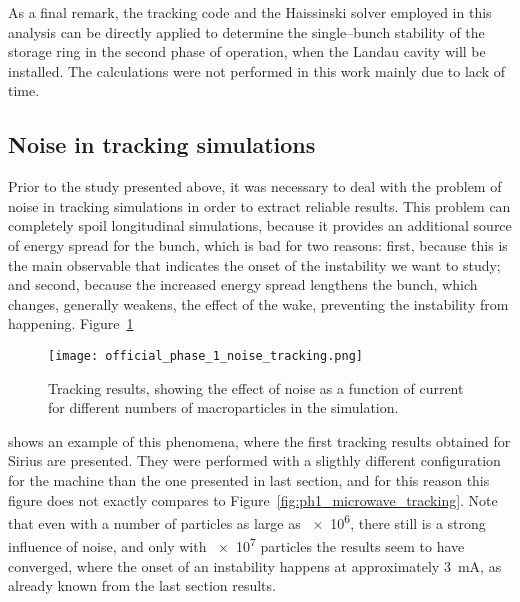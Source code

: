     As a final remark, the tracking code and the Haissinski solver employed in this analysis can be directly applied to determine the single--bunch stability of the storage ring in the second phase of operation, when the Landau cavity will be installed. The calculations were not performed in this work mainly due to lack of time.

\subsection{Noise in tracking simulations}\label{ssec:noise}

    Prior to the study presented above, it was necessary to deal with the problem of noise in tracking simulations in order to extract reliable results. This problem can completely spoil longitudinal simulations, because it provides an additional source of energy spread for the bunch, which is bad for two reasons: first, because this is the main observable that indicates the onset of the instability we want to study; and second, because the increased energy spread lengthens the bunch, which changes, generally weakens, the effect of the wake, preventing the instability from happening. Figure~\ref{fig:first_tracking}
    \begin{figure}
        \centering
        \texttt{[image: official\_phase\_1\_noise\_tracking.png]}
        \caption{Tracking results, showing the effect of noise as a function of current for different numbers of macroparticles in the simulation.}
        \label{fig:first_tracking}
    \end{figure}
    shows an example of this phenomena, where the first tracking results obtained for Sirius are presented. They were performed with a sligthly different configuration for the machine than the one presented in last section, and for this reason this figure does not exactly compares to Figure~\ref{fig:ph1_microwave_tracking}. Note that even with a number of particles as large as \num{e6}, there still is a strong influence of noise, and only with \num{e7} particles the results seem to have converged, where the onset of an instability happens at approximately \SI{3}{\milli\ampere}, as already known from the last section results.

